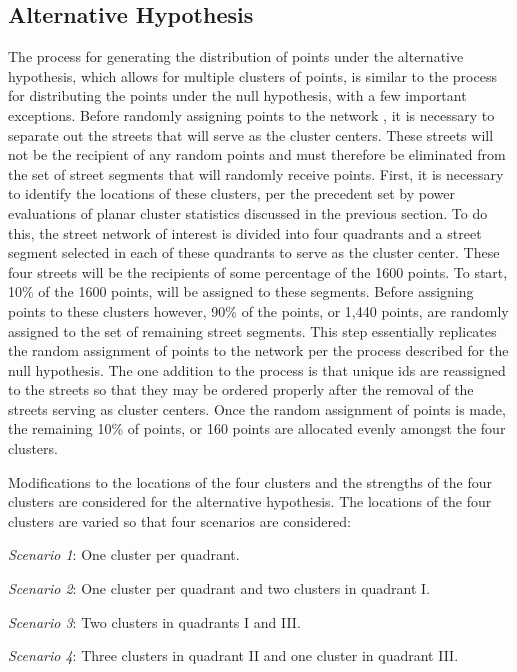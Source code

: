 \documentclass[12pt, letterpaper]{article}
\begin{document}
\subsection {Alternative Hypothesis}
The process for generating the distribution of points under the alternative hypothesis, which allows for multiple clusters of points, is similar to the process for distributing the points under the null hypothesis, with a few important exceptions. Before randomly assigning points to the network , it is necessary to separate out the streets that will serve as the cluster centers. These streets will not be the recipient of any random points and must therefore be eliminated from the set of street segments that will randomly receive points. First, it is necessary to identify the locations of these clusters, per the precedent set by power evaluations of planar cluster statistics discussed in the previous section. To do this, the street network of interest is divided into four quadrants and a street segment selected in each of these quadrants to serve as the cluster center. These four streets will be the recipients of some percentage of the 1600 points. To start, 10\% of the 1600 points, will be assigned to these segments. Before assigning points to these clusters however, 90\% of the points, or 1,440 points, are randomly assigned to the set of remaining street segments. This step essentially replicates the random assignment of points to the network per the process described for the null hypothesis. The one addition to the process is that unique ids are reassigned to the streets so that they may be ordered properly after the removal of the streets serving as cluster centers. Once the random assignment of points is made, the remaining 10\% of points, or 160 points are allocated evenly amongst the four clusters. 

Modifications to the locations of the four clusters and the strengths of the four clusters are considered for the alternative hypothesis. The locations of the four clusters are varied so that four scenarios are considered:

\emph{Scenario 1}: One cluster per quadrant.

\emph{Scenario 2}: One cluster per quadrant and two clusters in quadrant I.

\emph{Scenario 3}: Two clusters in quadrants I and III.

\emph{Scenario 4}: Three clusters in quadrant II and one cluster in quadrant III.
\end{document}

